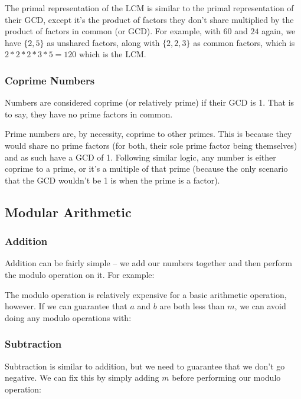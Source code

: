 The primal representation of the LCM is similar to the primal representation of their GCD, except it's the product of factors they don't share multiplied by the product of factors in common (or GCD). For example, with $60$ and $24$ again, we have $\{2,5\}$ as unshared factors, along with $\{2,2,3\}$ as common factors, which is $2 * 2 * 2 * 3 * 5 = 120$ which is the LCM.

\subsubsection{Coprime Numbers}

Numbers are considered coprime (or relatively prime) if their GCD is 1. That is to say, they have no prime factors in common.

Prime numbers are, by necessity, coprime to other primes. This is because they would share no prime factors (for both, their sole prime factor being themselves) and as such have a GCD of 1. Following similar logic, any number is either coprime to a prime, or it's a multiple of that prime (because the only scenario that the GCD wouldn't be 1 is when the prime is a factor).

\subsection{Modular Arithmetic}

\subsubsection{Addition}

Addition can be fairly simple -- we add our numbers together and then perform the modulo operation on it. For example:


The modulo operation is relatively expensive for a basic arithmetic operation, however. If we can guarantee that $a$ and $b$ are both less than $m$, we can avoid doing any modulo operations with:


\subsubsection{Subtraction}

Subtraction is similar to addition, but we need to guarantee that we don't go negative. We can fix this by simply adding $m$ before performing our modulo operation:

